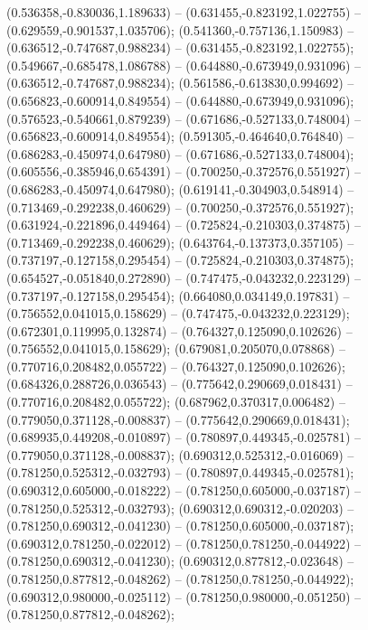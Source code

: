  (0.536358,-0.830036,1.189633) -- (0.631455,-0.823192,1.022755) -- (0.629559,-0.901537,1.035706);
 (0.541360,-0.757136,1.150983) -- (0.636512,-0.747687,0.988234) -- (0.631455,-0.823192,1.022755);
 (0.549667,-0.685478,1.086788) -- (0.644880,-0.673949,0.931096) -- (0.636512,-0.747687,0.988234);
 (0.561586,-0.613830,0.994692) -- (0.656823,-0.600914,0.849554) -- (0.644880,-0.673949,0.931096);
 (0.576523,-0.540661,0.879239) -- (0.671686,-0.527133,0.748004) -- (0.656823,-0.600914,0.849554);
 (0.591305,-0.464640,0.764840) -- (0.686283,-0.450974,0.647980) -- (0.671686,-0.527133,0.748004);
 (0.605556,-0.385946,0.654391) -- (0.700250,-0.372576,0.551927) -- (0.686283,-0.450974,0.647980);
 (0.619141,-0.304903,0.548914) -- (0.713469,-0.292238,0.460629) -- (0.700250,-0.372576,0.551927);
 (0.631924,-0.221896,0.449464) -- (0.725824,-0.210303,0.374875) -- (0.713469,-0.292238,0.460629);
 (0.643764,-0.137373,0.357105) -- (0.737197,-0.127158,0.295454) -- (0.725824,-0.210303,0.374875);
 (0.654527,-0.051840,0.272890) -- (0.747475,-0.043232,0.223129) -- (0.737197,-0.127158,0.295454);
 (0.664080,0.034149,0.197831) -- (0.756552,0.041015,0.158629) -- (0.747475,-0.043232,0.223129);
 (0.672301,0.119995,0.132874) -- (0.764327,0.125090,0.102626) -- (0.756552,0.041015,0.158629);
 (0.679081,0.205070,0.078868) -- (0.770716,0.208482,0.055722) -- (0.764327,0.125090,0.102626);
 (0.684326,0.288726,0.036543) -- (0.775642,0.290669,0.018431) -- (0.770716,0.208482,0.055722);
 (0.687962,0.370317,0.006482) -- (0.779050,0.371128,-0.008837) -- (0.775642,0.290669,0.018431);
 (0.689935,0.449208,-0.010897) -- (0.780897,0.449345,-0.025781) -- (0.779050,0.371128,-0.008837);
 (0.690312,0.525312,-0.016069) -- (0.781250,0.525312,-0.032793) -- (0.780897,0.449345,-0.025781);
 (0.690312,0.605000,-0.018222) -- (0.781250,0.605000,-0.037187) -- (0.781250,0.525312,-0.032793);
 (0.690312,0.690312,-0.020203) -- (0.781250,0.690312,-0.041230) -- (0.781250,0.605000,-0.037187);
 (0.690312,0.781250,-0.022012) -- (0.781250,0.781250,-0.044922) -- (0.781250,0.690312,-0.041230);
 (0.690312,0.877812,-0.023648) -- (0.781250,0.877812,-0.048262) -- (0.781250,0.781250,-0.044922);
 (0.690312,0.980000,-0.025112) -- (0.781250,0.980000,-0.051250) -- (0.781250,0.877812,-0.048262);
